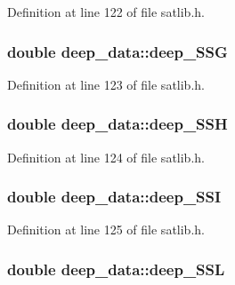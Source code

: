 Definition at line 122 of file satlib.\-h.

\hypertarget{structdeep__data_a6093e8f162d848d6611bf4acaeb1af52}{
\subsubsection[{deep\-\_\-\-S\-S\-G}]{\setlength{\rightskip}{0pt plus 5cm}double deep\-\_\-data\-::deep\-\_\-\-S\-S\-G}}\label{structdeep__data_a6093e8f162d848d6611bf4acaeb1af52}


Definition at line 123 of file satlib.\-h.

\hypertarget{structdeep__data_aedb85dc9534d5c4bc49a95f7986e23c9}{
\subsubsection[{deep\-\_\-\-S\-S\-H}]{\setlength{\rightskip}{0pt plus 5cm}double deep\-\_\-data\-::deep\-\_\-\-S\-S\-H}}\label{structdeep__data_aedb85dc9534d5c4bc49a95f7986e23c9}


Definition at line 124 of file satlib.\-h.

\hypertarget{structdeep__data_a7089f2ba95f129f977cdcc81f190a4e2}{
\subsubsection[{deep\-\_\-\-S\-S\-I}]{\setlength{\rightskip}{0pt plus 5cm}double deep\-\_\-data\-::deep\-\_\-\-S\-S\-I}}\label{structdeep__data_a7089f2ba95f129f977cdcc81f190a4e2}


Definition at line 125 of file satlib.\-h.

\hypertarget{structdeep__data_abf490744760034dc2d45f92b0983ee9c}{
\subsubsection[{deep\-\_\-\-S\-S\-L}]{\setlength{\rightskip}{0pt plus 5cm}double deep\-\_\-data\-::deep\-\_\-\-S\-S\-L}}\label{structdeep__data_abf490744760034dc2d45f92b0983ee9c}


